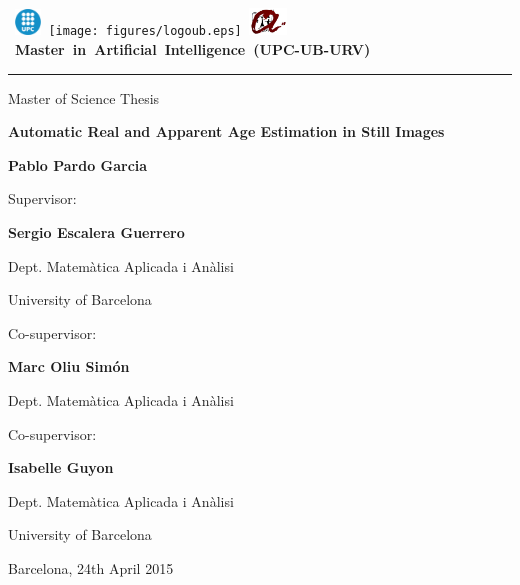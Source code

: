 \thispagestyle{empty}
\vspace*{-2cm}

\hbox{
\includegraphics[width=0.7cm]{figures/logoupc.eps}
\texttt{[image: figures/logoub.eps]}
\includegraphics[width=1cm]{figures/logourv.eps}
\Large \bf Master in Artificial Intelligence (UPC-UB-URV)}
\hrule

\bigskip\bigskip\bigskip

\begin{center}

{\LARGE Master of Science Thesis}

\bigskip\bigskip\bigskip\bigskip\bigskip

\textbf{\huge \bf Automatic Real and Apparent Age Estimation in Still Images}

\bigskip\bigskip\bigskip\bigskip\bigskip

{\LARGE \bf Pablo Pardo Garcia}

\vspace*{5cm}

\begin{multicols}{2}
{\large Supervisor:}

\medskip\medskip\smallskip

{\Large\bf Sergio Escalera Guerrero}

\medskip\medskip

{\Large Dept. Matemàtica Aplicada i Anàlisi}

\medskip

{\Large University of Barcelona}


\bigskip\bigskip\bigskip

{\large Co-supervisor:}

\medskip\medskip\smallskip

{\Large\bf Marc Oliu Simón}

\medskip\medskip

{\Large Dept. Matemàtica Aplicada i Anàlisi}

{\large Co-supervisor:}

\medskip\medskip\smallskip

{\Large\bf Isabelle Guyon}

\medskip\medskip

{\Large Dept. Matemàtica Aplicada i Anàlisi}

\medskip

{\Large University of Barcelona}
\end{multicols}

\medskip\medskip\medskip\medskip\medskip

{\Large Barcelona, 24th April 2015}

\end{center}


